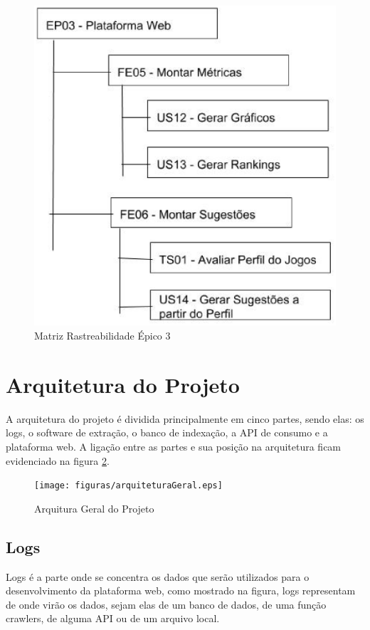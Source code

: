 \begin{figure}
\centering
\includegraphics[scale=0.35]{figuras/EP03.eps}
\caption{Matriz Rastreabilidade Épico 3}
\label{image:ep03}
\end{figure}
\section{Arquitetura do Projeto}
A arquitetura do projeto é dividida principalmente em cinco partes, sendo elas: os logs, o software de extração, o banco de indexação, a API de consumo e a plataforma web. A ligação entre as partes e sua posição na arquitetura ficam evidenciado na figura \ref{image:arquitetura}.
\begin{figure}
\centering
\texttt{[image: figuras/arquiteturaGeral.eps]}
\caption{Arquitura Geral do Projeto}
\label{image:arquitetura}
\end{figure}
\subsection{Logs}
Logs é a parte onde se concentra os dados que serão utilizados para o desenvolvimento da plataforma web, como mostrado na figura, logs representam de onde virão os dados, sejam elas de um banco de dados, de uma função crawlers, de alguma API ou de um arquivo local.

